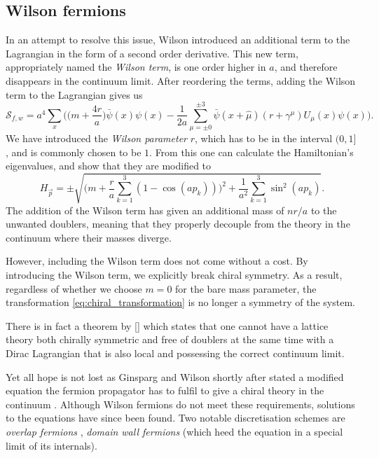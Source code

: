 \subsection{Wilson fermions}

In an attempt to resolve this issue, Wilson introduced an additional term to the
Lagrangian in the form of a second order derivative. This new term,
appropriately named the \emph{Wilson term}, is one order higher in $a$, and
therefore disappears in the continuum limit. After reordering the terms, adding
the Wilson term to the Lagrangian gives us
%
\begin{equation} \label{eq:wilson_action}
  \mathcal{S}_{f,w} = a^4 \sum_{x} \bigg(
  \big(m + {\textstyle\frac{4 r}{a}}\big) \bar{\psi}(x) \psi(x)
  - \frac{1}{2a} \sum_{\mu = \pm 0}^{\pm 3} \bar{\psi}(x+\hat{\mu}) (r +
  \gamma^{\mu}) U_{\mu}(x) \psi(x) \bigg).
\end{equation}
%
We have introduced the \emph{Wilson parameter} $r$, which has to be in the
interval $(0, 1]$, and is commonly chosen to be $1$. From this one can calculate
the Hamiltonian's eigenvalues, and show that they are modified to
%
\begin{equation}
  H_{\vec{p}} = \pm \sqrt{\bigg(m + \frac{r}{a}\sum_{k=1}^3 (1 - \cos (a p_k) ) \bigg)^2
    + \frac{1}{a^2} \sum_{k=1}^3 \sin^2 (a p_k)}.
\end{equation}
%
The addition of the Wilson term has given an additional mass of $n r/a$ to the
unwanted doublers, meaning that they properly decouple from the theory in the
continuum where their masses diverge. 

However, including the Wilson term does not come without a cost. By introducing
the Wilson term, we explicitly break chiral symmetry. As a result, regardless of
whether we choose $m=0$ for the bare mass parameter, the transformation
\eqref{eq:chiral_transformation} is no longer a symmetry of the system. 

There is in fact a theorem by \citeauthor{Nielsen:1980rz}
[\citeyear{Nielsen:1980rz,Nielsen:1981xu}] which states that one cannot have a
lattice theory both chirally symmetric and free of doublers at the same time
with a Dirac Lagrangian that is also local and possessing the correct continuum
limit.

Yet all hope is not lost as Ginsparg and Wilson shortly after stated a modified
equation the fermion propagator has to fulfil to give a chiral theory in the
continuum \citep{Ginsparg:1981bj}. Although Wilson fermions do not meet these
requirements, solutions to the equations have since been found. Two notable
discretisation schemes are \emph{overlap fermions} \citep{Neuberger:1997fp,Neuberger:1998wv},
\emph{domain wall fermions} \citep{Kaplan:1992bt} (which heed the equation in a
special limit of its internals).

